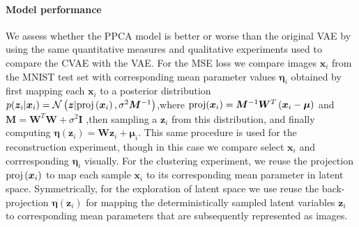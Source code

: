 \paragraph{Model performance}
We assess whether the PPCA model is better or worse than the original VAE by using the same quantitative measures and qualitative experiments used to compare the CVAE with the VAE. For the MSE loss we compare images $\bm{x}_i$ from the MNIST test set with corresponding mean parameter values $\bm{\eta}_i$ obtained by first mapping each $\bm{x}_i$ to a posterior distribution $p(\bm{z}_i|\bm{x}_i) = \mathcal{N}\left (\bm{z}| \text{proj}\left (\bm{x}_i\right), \sigma^2 \bm{M}^{-1}\right)$,where  $\text{proj}(\bm{x}_i) = \bm{M}^{-1} \bm{W}^T\left (\bm{x}_i - \bm{\mu}\right)$ and $\bm{M} = \bm{W}^{T}\bm{W} + \sigma^2 \bm{I}$ ,then sampling a $\bm{z}_i$ from this distribution, and finally computing $\bm{\eta}(\bm{z}_i) = \bm{W}\bm{z}_i + \bm{\mu}_i$. This same procedure is used for the reconstruction experiment, though in this case we compare select $\bm{x}_i$ and corrresponding $\bm{\eta}_i$ visually. For the clustering experiment, we reuse the projection  $\text{proj}\left (\bm{x}_i\right)$ to map each sample $\bm{x}_i$ to its corresponding mean parameter in latent space. Symmetrically, for the exploration of latent space we use reuse the back-projection $\bm{\eta}(\bm{z}_i)$ for mapping the deterministically sampled latent variables $\bm{z}_i$ to corresponding mean parameters that are subsequently represented as images.